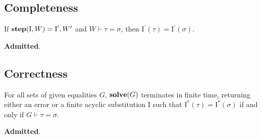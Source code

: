\documentclass[10pt, letterpaper, oneside]{article}
\newcommand{\inertset}{\text{I}}
\newcommand{\Admitted}{{\color{red}\bf Admitted}}
\begin{document}

\subsection{Completeness}

\begin{theorem}
  \label{theorem:step-sound}
  If \(\text{\bf step}(\inertset, W) = \inertset^\prime, W^\prime\) and \(W \vdash \tau = \sigma\), then \(\inertset^\prime(\tau) = \inertset^\prime(\sigma)\).
\end{theorem}

\Admitted.

\subsection{Correctness}

\begin{corollary}
  For all sets of {\sc given} equalities \(G\), \(\text{\bf solve}(G)\) terminates in finite time, returning either an error or a finite acyclic substitution \(\inertset\) such that \(\inertset^\ast(\tau) = \inertset^\ast(\sigma)\) if and only if \(G \vdash \tau = \sigma\).
\end{corollary}

\Admitted.
\end{document}
